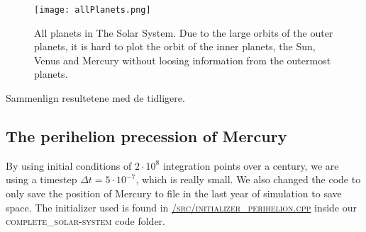 \documentclass[../main.tex]{subfiles}
\begin{document}
\begin{figure}[!h]
  \texttt{[image: allPlanets.png]}
  \caption{All planets in The Solar System. Due to the large orbits of the outer planets, it is hard to plot the orbit of the inner planets, the Sun, Venus and Mercury without loosing information from the outermost planets.}
  \label{fig:allPlanets}
\end{figure}


Sammenlign resultetene med de tidligere.

\subsection{The perihelion precession of Mercury}
By using initial conditions of $2 \cdot 10^8$ integration points over a century, we are using a timestep $\Delta t = 5\cdot 10^{-7}$, which is really small. We also changed the code to only save the position of Mercury to file in the last year of simulation to save space. The initializer used is found in \href{https://github.com/kmaasrud/Project-5/blob/master/code/complete_solar-system/src/initialize_perihelion.cpp}{\textsc{/src/initializer\_perihelion.cpp}} inside our \textsc{complete\_solar-system} code folder.

\begin{table}[!h]
  \centering
  \caption{Table of Mercury's calculated perihelion precession with and without relativistic correction.}
\end{table}
\FloatBarrier
\end{document}
